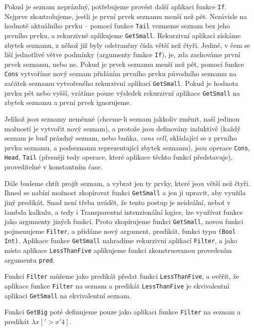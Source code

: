 Pokud je seznam neprázdný, potřebujeme provést další aplikaci funkce \lstinline{If}. Nejprve
zkontrolujeme, jestli je první prvek seznamu menší než pět. Nezávisle na hodnotě aktuálního prvku --
pomocí funkce \lstinline{Tail} vezmeme seznam bez jeho prvního prvku, a rekurzivně aplikujeme
\lstinline{GetSmall}. Rekurzivní aplikací získáme zbytek seznamu, z něhož již byly odstraněny čísla
větší než čtyři. Jediné, v čem se liší jednotlivé větve podmínky (argumenty funkce \lstinline{If}),
je, zda zachováme první prvek seznamu, nebo ne. Pokud je prvek seznamu menší než pět, pomocí funkce
\lstinline{Cons} vytvoříme nový seznam přidáním prvního prvku původního seznamu na začátek seznamu
vytvořeného rekurzivní aplikací \lstinline{GetSmall}. Pokud je hodnota prvku pět nebo vyšší, vrátíme
pouze výsledek rekurzivní aplikace \lstinline{GetSmall} na zbytek seznamu a první prvek ignorujeme.

Jelikož jsou seznamy neměnné (chceme-li seznam jakkoliv změnit, naší jedinou možností je vytvořit
nový seznam), a protože jsou definovány induktivě (každý seznam je buď prázdný seznam, nebo buňka,
\textit{cons cell}, skládající se z prvního prvku seznamu, a podseznamu reprezentující zbytek
seznamu), jsou operace \lstinline{Cons}, \lstinline{Head}, \lstinline{Tail} (přesněji tedy operace,
které aplikace těchto funkcí představuje), proveditelné v konstantním čase.

Dále budeme chtít projít seznam, a vybrat jen ty prvky, které jsou větší než čtyři. Ihned se nabízí
možnost zkopírovat funkci \lstinline{GetSmall} a jen ji upravit, aby využila jiný predikát. Snad
není třeba uvádět, že tento postup je neideální, neboť v lambda kalkulu, a tedy i Transparentní
intenzionální logice, lze využívat funkce jako argumenty jiných funkcí. Proto zkopírujeme funkci
\lstinline{GetSmall}, novou funkci pojmenujeme \lstinline{Filter}, a přidáme nový argument,
predikát, funkci typu \lstinline{(Bool Int)}. Aplikace funkce \lstinline{GetSmall} nahradíme
rekurzivní aplikací \lstinline{Filter}, a jako místo aplikace \lstinline{LessThanFive} aplikujeme
funkci zkonstruovanou provedením argumentu \lstinline{pred}.

Funkci \lstinline{Filter} můžeme jako predikát předat funkci \lstinline{LessThanFive}, a ověřit,
že aplikace funkce \lstinline{Filter} na seznam a predikát \lstinline{LessThanFive} je ekvivalentní
aplikaci \lstinline{GetSmall} na ekvivalentní seznam.

Funkci \lstinline{GetBig} poté definujeme pouze jako aplikaci funkce \lstinline{Filter} na seznam
a predikát $\lambda x ['> x '4]$.

